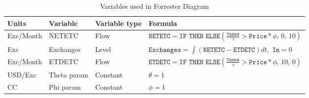 \begin{longtable}[c]{p{1.71cm}p{2cm}p{1.5cm}p{11cm}}
\caption{Variables used in Forrester Diagram}
\label{tab:var}\\
\hline
\textbf{Units} & \textbf{Variable}    & \textbf{Variable type} & \textbf{Formula}                                                                                                                                                                                                                                                                                                        \\ \hline
\endfirsthead
%
\endhead
%
\hline
\endfoot
%
\endlastfoot
%
Exc/Month      & NETETC               & Flow                      & \small$\displaystyle\texttt{NETETC}=\texttt{IF THEN ELSE}\left( \frac{\texttt{Taxes}}{\gamma} > \texttt{Price}*\phi ,\, 0 ,\, 10 \right)$                                                                                                                                                                       \\[4mm]
Exc            & Exchanges            & Level                     & \small$\displaystyle\texttt{Exchanges} = \int(\texttt{NETETC}-\texttt{ETDETC})dt,\,\, \texttt{In}=0$                                                                                                                                                                                                                         \\[4mm]
Exc/Month      & ETDETC               & Flow                      & \small$\displaystyle\texttt{ETDETC}=\texttt{IF THEN ELSE}\left( \frac{\texttt{Taxes}}{\gamma} > \texttt{Price}*\phi,\, 10 ,\, 0 \right)$                                                                                                                                                                                 \\[4mm]
USD/Exc        & Theta param          & Constant                  & \small$\displaystyle\theta=1$                                                                                                                                                                                                                                                                                        \\[4mm]
CC             & Phi param            & Constant                  & \small$\displaystyle\phi=1$                                                                                                                                                                                                                                                                                          \\[4mm]

\end{longtable}
